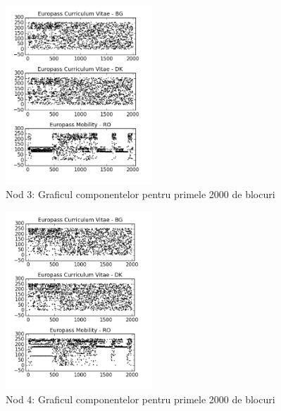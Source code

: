 \documentclass{llncs}
\begin{document}
\begin{figure}
\begin{center}
\includegraphics[width=0.49\textwidth]{img/db3.png}    %
\caption{Nod 3: Graficul componentelor pentru primele 2000 de blocuri} 
\label{fig:db3}
\end{center}
\end{figure}

\begin{figure}
\begin{center}
\includegraphics[width=0.49\textwidth]{img/db4.png}    %
\caption{Nod 4: Graficul componentelor pentru primele 2000 de blocuri} 
\label{fig:db4}
\end{center}
\end{figure}
\end{document}
